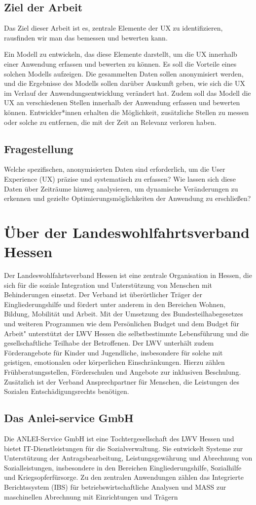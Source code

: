 \documentclass[12pt,oneside]{article}
\begin{document}
\subsection{Ziel der Arbeit}
Das Ziel dieser Arbeit ist es, zentrale Elemente der UX zu identifizieren, rausfinden wir man das bemessen und bewerten kann. 

Ein Modell zu entwickeln, das diese Elemente darstellt, um die UX innerhalb einer Anwendung erfassen und bewerten zu können. Es soll die Vorteile eines solchen Modells aufzeigen.
Die gesammelten Daten sollen anonymisiert werden, und die Ergebnisse des Modells sollen darüber Auskunft geben, wie sich die UX im Verlauf der Anwendungsentwicklung verändert hat. Zudem soll das Modell die UX an verschiedenen Stellen innerhalb der Anwendung erfassen und bewerten können. Entwickler*innen erhalten die Möglichkeit, zusätzliche Stellen zu messen oder solche zu entfernen, die mit der Zeit an Relevanz verloren haben.
\subsection{Fragestellung}
Welche spezifischen, anonymisierten Daten sind erforderlich, um die User Experience (UX) präzise und systematisch zu erfassen? Wie lassen sich diese Daten über Zeiträume hinweg analysieren, um dynamische Veränderungen zu erkennen und gezielte Optimierungsmöglichkeiten der Anwendung zu erschließen?

\section{Über der Landeswohlfahrtsverband Hessen}
Der Landeswohlfahrtsverband Hessen ist eine zentrale Organisation in Hessen, die sich für die soziale Integration und Unterstützung von Menschen mit Behinderungen einsetzt. Der Verband ist überörtlicher Träger der Eingliederungshilfe und fördert unter anderem in den Bereichen Wohnen, Bildung, Mobilität und Arbeit. Mit der Umsetzung des Bundesteilhabegesetzes und weiteren Programmen wie dem Persönlichen Budget  und dem Budget für Arbeit" unterstützt der LWV Hessen die selbstbestimmte Lebensführung und die gesellschaftliche Teilhabe der Betroffenen. Der LWV unterhält zudem Förderangebote für Kinder und Jugendliche, insbesondere für solche mit geistigen, emotionalen oder körperlichen Einschränkungen. Hierzu zählen Frühberatungsstellen, Förderschulen und Angebote zur inklusiven Beschulung. Zusätzlich ist der Verband Ansprechpartner für Menschen, die Leistungen des Sozialen Entschädigungsrechts benötigen.\subsection{Das Anlei-service GmbH}
Die ANLEI-Service GmbH ist eine Tochtergesellschaft des LWV Hessen  und bietet IT-Dienstleistungen für die Sozialverwaltung. Sie entwickelt Systeme zur Unterstützung der Antragsbearbeitung, Leistungsgewährung und Abrechnung von Sozialleistungen, insbesondere in den Bereichen Eingliederungshilfe, Sozialhilfe und Kriegsopferfürsorge. Zu den zentralen Anwendungen zählen das Integrierte Berichtssystem (IBS) für betriebswirtschaftliche Analysen und MASS zur maschinellen Abrechnung mit Einrichtungen und Trägern
\end{document}
